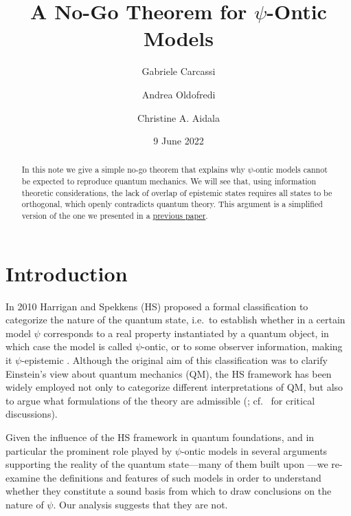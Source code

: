 \documentclass[10pt,twocolumn, nofootinbib]{revtex4-2}
\begin{document}
\title{A No-Go Theorem for $\psi$-Ontic Models}
\author{Gabriele Carcassi}
\author{Andrea Oldofredi}
\author{Christine A. Aidala}

\date{9 June 2022}


\begin{abstract}
In this note we give a simple no-go theorem that explains why $\psi$-ontic models cannot be expected to reproduce quantum mechanics. We will see that, using information theoretic considerations, the lack of overlap of epistemic states requires all states to be orthogonal, which openly contradicts quantum theory. This argument is a simplified version of the one we presented in a \href{https://arxiv.org/pdf/2201.11842.pdf}{previous paper}.
\end{abstract}

\maketitle

\section{Introduction}
In 2010 Harrigan and Spekkens (HS) proposed a formal classification to categorize the nature of the quantum state, i.e.\ to establish whether in a certain model $\psi$ corresponds to a real property instantiated by a quantum object, in which case the model is called $\psi$-ontic, or to some observer information, making it $\psi$-epistemic \cite{Harrigan:2010}. Although the original aim of this classification was to clarify Einstein's view about quantum mechanics (QM), the HS framework has been widely employed not only to categorize different interpretations of QM, but also to argue what formulations of the theory are admissible (\cite{PBR:2012, Leifer:2013, Leifer:2017, Branciard:2014, Hermens:2021, Wood:2015, Ringbauer:2015, Mazurek:2016, Bartlett:2012}; cf.\ \cite{Oldofredi:2020b, Lewis:2012, Ladyman:2021} for critical discussions). 

Given the influence of the HS framework in quantum foundations, and in particular the prominent role played by $\psi$-ontic models in several arguments supporting the reality of the quantum state---many of them built upon \cite{PBR:2012}---we re-examine the definitions and features of such models in order to understand whether they constitute a sound basis from which to draw conclusions on the nature of $\psi$. Our analysis suggests that they are not.
\end{document}
